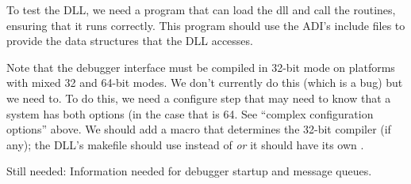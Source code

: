 \documentclass{article}
\begin{document}
To test the DLL, we need a program  that can
load the dll and call the routines, ensuring that it runs correctly.
This program should use the ADI's include files to provide the data
structures that the DLL accesses.

Note that the debugger interface must be compiled in 32-bit mode on
platforms with mixed 32 and 64-bit modes.  We don't currently do this
(which is a bug) but we need to.  To do this, we need a configure step
that may need to know that a system has both options (in the case that
 is 64.  See ``complex configuration
options'' above.  We should add a macro  that
determines the 32-bit compiler (if any); the DLL's makefile should use
 instead of  \emph{or} it should have its own
. 

Still needed: Information needed for debugger startup and message
queues.




\end{document}
